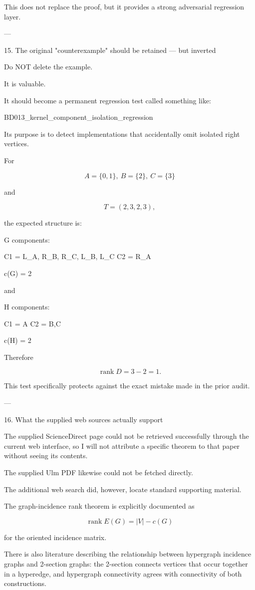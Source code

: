 This does not replace the proof, but it provides a strong adversarial regression layer.


---

15. The original "counterexample" should be retained — but inverted

Do NOT delete the example.

It is valuable.

It should become a permanent regression test called something like:

BD013_kernel_component_isolation_regression

Its purpose is to detect implementations that accidentally omit isolated right vertices.

For

\[
A=\{0,1\},\ B=\{2\},\ C=\{3\}
\]

and

\[
T=(2,3,2,3),
\]

the expected structure is:

G components:

C1 = {L_A, R_B, R_C, L_B, L_C}
C2 = {R_A}

c(G) = 2

and

H components:

C1 = {A}
C2 = {B,C}

c(H) = 2

Therefore

\[
\operatorname{rank}D=3-2=1.
\]

This test specifically protects against the exact mistake made in the prior audit.


---

16. What the supplied web sources actually support

The supplied ScienceDirect page could not be retrieved successfully through the current web interface, so I will not attribute a specific theorem to that paper without seeing its contents.

The supplied Ulm PDF likewise could not be fetched directly.

The additional web search did, however, locate standard supporting material.

The graph-incidence rank theorem is explicitly documented as

\[
\operatorname{rank}E(G)=|V|-c(G)
\]

for the oriented incidence matrix. 

There is also literature describing the relationship between hypergraph incidence graphs and 2-section graphs: the 2-section connects vertices that occur together in a hyperedge, and hypergraph connectivity agrees with connectivity of both constructions. 

